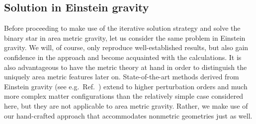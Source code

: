 \subsection{Solution in Einstein gravity}\label{section_einstein_waves}
Before proceeding to make use of the iterative solution strategy and solve the binary star in area metric gravity, let us consider the same problem in Einstein gravity. We will, of course, only reproduce well-established results, but also gain confidence in the approach and become acquainted with the calculations. It is also advantageous to have the metric theory at hand in order to distinguish the uniquely area metric features later on. State-of-the-art methods derived from Einstein gravity (see e.g.~Ref.~\cite{poisson2014gravity}) extend to higher perturbation orders and much more complex matter configurations than the relatively simple case considered here, but they are not applicable to area metric gravity. Rather, we make use of our hand-crafted approach that accommodates nonmetric geometries just as well.


